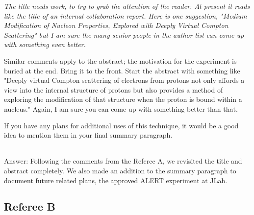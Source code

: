 \documentclass{article}
\begin{document}
{\em The title needs work, to try to grab the attention of the reader.
At present it reads like the title of an internal collaboration
report. Here is one suggestion, "Medium Modification of Nucleon 
Properties, Explored with Deeply Virtual Compton Scattering" but 
I am sure the many senior people in the author list can come up
with something even better.

Similar comments apply to the abstract; the motivation for the
experiment is buried at the end. Bring it to the front. Start the
abstract with something like "Deeply virtual Compton scattering of
electrons from protons not only affords a view into the internal
structure of protons but also provides a method of exploring the
modification of that structure when the proton is bound within a
nucleus." Again, I am sure you can come up with something better than
that.

If you have any plans for additional uses of this technique, it
would be a good idea to mention them in your final summary paragraph.}

\noindent \\
Answer: Following the comments from the Referee A, we revisited the title and abstract completely. We
also made an addition to the summary paragraph to document future related plans, the approved ALERT experiment at JLab.

\subsection{Referee B}
\end{document}
